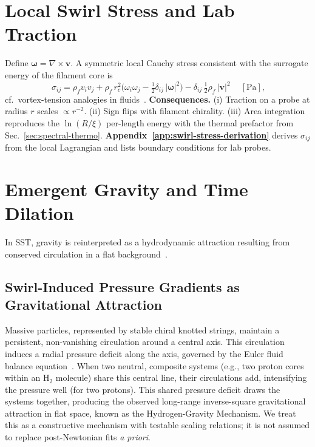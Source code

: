 \documentclass[10pt,reprint,aps,onecolumn,nofootinbib]{revtex4-2}
\begin{document}
    \section{Local Swirl Stress and Lab Traction}\label{sec:swirl-stress}
        Define \(\boldsymbol{\omega}=\nabla\times\mathbf{v}\).
        A symmetric local Cauchy stress consistent with the surrogate energy of the filament core is
        \[
            \boxed{~
            \sigma_{ij}
                = \rho_{\!f} v_i v_j
                + \rho_{\!f}\,r_c^{2}\Big(\omega_i\omega_j-\tfrac12\delta_{ij}\,|\boldsymbol{\omega}|^{2}\Big)
                - \delta_{ij}\,\tfrac12 \rho_{\!f}\,|\mathbf{v}|^{2}
                ~} \quad [\mathrm{Pa}],
        \]
        cf.\ vortex-tension analogies in fluids~\cite{Saffman1992,Batchelor1967,LandauFM}.
        \textbf{Consequences.} (i) Traction on a probe at radius \(r\) scales \(\propto r^{-2}\).
        (ii) Sign flips with filament chirality.
        (iii) Area integration reproduces the \(\ln(R/\xi)\) per-length energy with the thermal prefactor from Sec.~\ref{sec:spectral-thermo}.
        \textbf{Appendix~\ref{app:swirl-stress-derivation}} derives \(\sigma_{ij}\) from the local Lagrangian and lists boundary conditions for lab probes.


    \section{Emergent Gravity and Time Dilation}\label{sec:gravity}
    In SST, gravity is reinterpreted as a hydrodynamic attraction resulting from conserved circulation in a flat background~\cite{chiralSwirl}.

        \subsection*{Swirl-Induced Pressure Gradients as Gravitational Attraction}
            Massive particles, represented by stable chiral knotted strings, maintain a persistent, non-vanishing circulation around a central axis. This circulation induces a radial pressure deficit along the axis, governed by the Euler fluid balance equation~\cite{sstCanon}. When two neutral, composite systems (e.g., two proton cores within an H$_2$ molecule) share this central line, their circulations add, intensifying the pressure well (for two protons). This shared pressure deficit draws the systems together, producing the observed long-range inverse-square gravitational attraction in flat space, known as the Hydrogen-Gravity Mechanism. We treat this as a constructive mechanism with testable scaling relations; it is not assumed to replace post-Newtonian fits \textit{a priori}.
\end{document}
